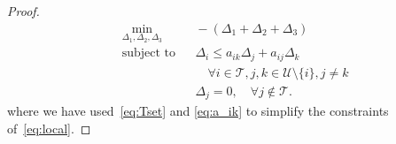\begin{proof}
%
\begin{equation}
\label{eq:delta}
\begin{aligned}
	& \underset{\Delta_{1}, \Delta_{2}, \Delta_{3}}{\text{min}}
	&& \!\! -(\Delta_{1} + \Delta_{2} + \Delta_{3})\\
	& \text{subject to}
	&& 	\!\! \Delta_i \leq a_{ik}\Delta_{j} + a_{ij}\Delta_{k} \\
	&&& \quad \forall i \in \mathcal{T}, j,k \in \mathcal{U} \setminus\{i\}, j\neq k\\
	&&& \Delta_j = 0, \quad \forall j \notin \mathcal{T}.
\end{aligned}
\end{equation}
%
where we have used~\eqref{eq:Tset} and \eqref{eq:a_ik} to simplify the constraints of~\eqref{eq:local}.


\end{proof}
